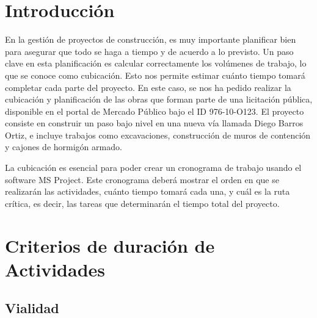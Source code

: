 \documentclass{article} %
\begin{document}
\newpage
\tableofcontents
\thispagestyle{plain} %
\thispagestyle{empty} %
\newpage

\setcounter{page}{1} %
\section{Introducción}

En la gestión de proyectos de construcción, es muy importante planificar bien para asegurar que todo se haga a tiempo y de acuerdo a lo previsto. Un paso clave en esta planificación es calcular correctamente los volúmenes de trabajo, lo que se conoce como cubicación. Esto nos permite estimar cuánto tiempo tomará completar cada parte del proyecto. En este caso, se nos ha pedido realizar la cubicación y planificación de las obras que forman parte de una licitación pública, disponible en el portal de Mercado Público bajo el ID 976-10-O123. El proyecto consiste en construir un paso bajo nivel en una nueva vía llamada Diego Barros Ortiz, e incluye trabajos como excavaciones, construcción de muros de contención y cajones de hormigón armado.

La cubicación es esencial para poder crear un cronograma de trabajo usando el software MS Project. Este cronograma deberá mostrar el orden en que se realizarán las actividades, cuánto tiempo tomará cada una, y cuál es la ruta crítica, es decir, las tareas que determinarán el tiempo total del proyecto.
\newpage

\section{Criterios de duración de Actividades}

\subsection{Vialidad}
\end{document}
